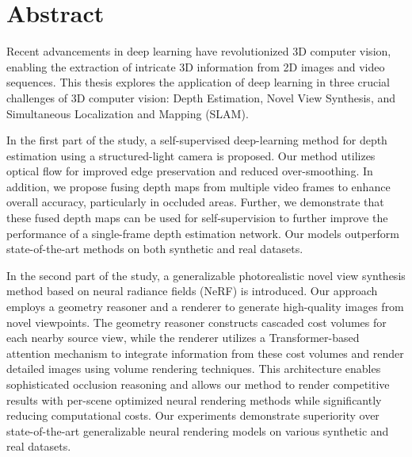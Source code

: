 

\cleardoublepage
\chapter*{Abstract}
Recent advancements in deep learning have revolutionized 3D computer vision, enabling the extraction of intricate 3D information from 2D images and video sequences. This thesis explores the application of deep learning in three crucial challenges of 3D computer vision: Depth Estimation, Novel View Synthesis, and Simultaneous Localization and Mapping (SLAM).

\vspace{2ex}
In the first part of the study, a self-supervised deep-learning method for depth estimation using a structured-light camera is proposed. Our method utilizes optical flow for improved edge preservation and reduced over-smoothing. In addition, we propose fusing depth maps from multiple video frames to enhance overall accuracy, particularly in occluded areas. Further, we demonstrate that these fused depth maps can be used for self-supervision to further improve the performance of a single-frame depth estimation network. Our models outperform state-of-the-art methods on both synthetic and real datasets.

\vspace{2ex}
In the second part of the study, a generalizable photorealistic novel view synthesis method based on neural radiance fields (NeRF) is introduced. Our approach employs a geometry reasoner and a renderer to generate high-quality images from novel viewpoints. The geometry reasoner constructs cascaded cost volumes for each nearby source view, while the renderer utilizes a Transformer-based attention mechanism to integrate information from these cost volumes and render detailed images using volume rendering techniques. This architecture enables sophisticated occlusion reasoning and allows our method to render competitive results with per-scene optimized neural rendering methods while significantly reducing computational costs. Our experiments demonstrate superiority over state-of-the-art generalizable neural rendering models on various synthetic and real datasets.

